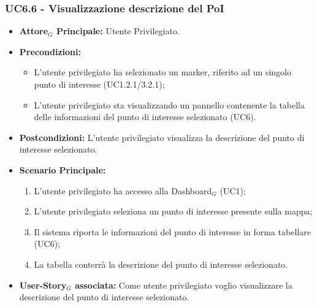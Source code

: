 \documentclass[11pt]{article}
\begin{document}
\begin{justify}
 \subsubsection{\textbf{UC6.6 - Visualizzazione descrizione del PoI}}
 \begin{itemize}
     \item \textbf{Attore$_G$ Principale:} Utente Privilegiato.
     \item \textbf{Precondizioni:}
       \begin{itemize}
    	        \item L'utente privilegiato ha selezionato un marker, riferito ad un singolo punto di interesse (UC1.2.1/3.2.1);
          \item L'utente privilegiato sta visualizzando un pannello contenente la tabella delle informazioni del punto di interesse selezionato (UC6).
       \end{itemize}
     \item \textbf{Postcondizioni:} L'utente privilegiato visualizza la descrizione del punto di interesse selezionato.
     \item \textbf{Scenario Principale:}
        \begin{enumerate}
            \item L'utente privilegiato ha accesso alla Dashboard$_G$ (UC1);
            \item L'utente privilegiato seleziona un punto di interesse presente sulla mappa;
            \item Il sistema riporta le informazioni del punto di interesse in forma tabellare (UC6);
            \item La tabella conterrà la descrizione del punto di interesse selezionato.
        \end{enumerate}
     \item \textbf{User-Story$_G$ associata:} Come utente privilegiato voglio visualizzare la descrizione del punto di interesse selezionato. 
 \end{itemize}



\end{justify}
\end{document}
